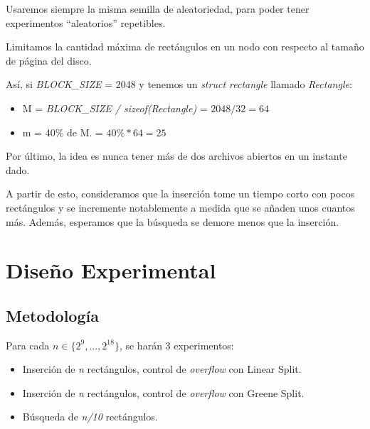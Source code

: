 \documentclass[letterpaper,10pt]{article}
\begin{document}
	Usaremos siempre la misma semilla de aleatoriedad, para poder tener experimentos ``aleatorios'' repetibles.

	Limitamos la cantidad máxima de rectángulos en un nodo con respecto al tamaño de página del disco.

	Así, si \textit{BLOCK\_SIZE} = 2048 y tenemos un \textit{struct rectangle} llamado \textit{Rectangle}:

	\begin{itemize}
		\item M = \textit{BLOCK\_SIZE / sizeof(Rectangle)} = $ 2048 / 32 = 64 $
		\item m = 40\% de M. = $ 40\% * 64 = 25 $
	\end{itemize}

	Por último, la idea es nunca tener más de dos archivos abiertos en un instante dado.

	A partir de esto, consideramos que la inserción tome un tiempo corto con pocos rectángulos y se incremente notablemente a medida que se añaden unos cuantos más.
	Además, esperamos que la búsqueda se demore menos que la inserción.

	\newpage

	\section{Diseño Experimental}

	\subsection{Metodología}

	Para cada $n \in \{2^{9}, ..., 2^{18}\}$, se harán 3 experimentos:

	\begin{itemize}
		\item Inserción de \textit{n} rectángulos, control de \textit{overflow} con Linear Split.
		\item Inserción de \textit{n} rectángulos, control de \textit{overflow} con Greene Split.
		\item Búsqueda de \textit{n/10} rectángulos.
	\end{itemize}
\end{document}
